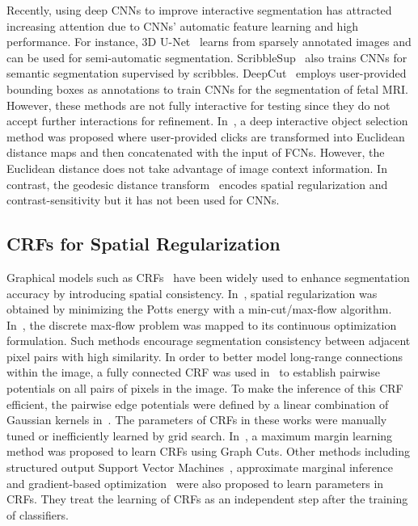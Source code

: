 \documentclass[10pt,journal,compsoc]{IEEEtran}
\begin{document}
Recently, using deep CNNs to improve interactive segmentation has attracted increasing attention due to CNNs' automatic feature learning  and high performance.  For instance, 3D U-Net~\cite{Abdulkadir2016} learns from sparsely annotated images and can be used for semi-automatic segmentation. ScribbleSup~\cite{Lin2016} also trains CNNs for semantic segmentation supervised by scribbles. DeepCut~\cite{Rajchl2016} employs user-provided bounding boxes as annotations to train CNNs for the segmentation of fetal MRI. However, these methods are not fully interactive for testing since they do not accept further interactions for refinement. In~\cite{Xu2016}, a deep interactive object selection method was proposed where user-provided clicks are transformed into Euclidean distance maps and then concatenated with the input of FCNs. However, the Euclidean distance does not take advantage of image context information. In contrast, the geodesic distance transform~\cite{Bai2007, Criminisi2008, Kohli2013} encodes spatial regularization and contrast-sensitivity but it has not been used for CNNs.  %

\subsection{CRFs for Spatial Regularization}
Graphical models such as CRFs~\cite{Boykov2004,Yuan2010,Chen2015iclr} have been widely used to enhance segmentation accuracy by introducing spatial consistency. In~\cite{Boykov2004}, spatial regularization was obtained by minimizing the Potts energy with a min-cut/max-flow algorithm. In~\cite{Yuan2010}, the discrete max-flow problem was mapped to its continuous optimization formulation. Such methods encourage segmentation consistency between adjacent pixel pairs with high similarity.  In order to better model long-range connections within the image, a fully connected CRF was used in~\cite{Payet2010} to establish pairwise potentials on all pairs of pixels in the image. To make the inference of this CRF efficient, the pairwise edge potentials were defined by a linear combination of Gaussian kernels in~\cite{Krahenbuhl2011}. The parameters of CRFs in these works were manually tuned or inefficiently learned by grid search.  
In~\cite{Szummer2008}, a maximum margin learning method was proposed to learn CRFs using Graph Cuts. Other methods including structured output Support Vector Machines~\cite{Blaschko2014}, approximate marginal inference~\cite{Domke2013} and gradient-based optimization~\cite{Krahenbuhl2013a} were also proposed to learn parameters in CRFs. They treat the learning of CRFs as an independent step after the training of classifiers.
\end{document}
